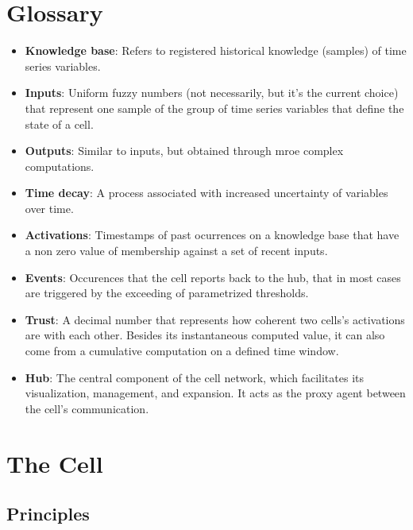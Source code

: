 \section{Glossary} \label{sec:glossary}


\begin{itemize}
    \item \textbf{Knowledge base}: Refers to registered historical knowledge (samples) of time series variables.

    \item \textbf{Inputs}: Uniform fuzzy numbers (not necessarily, but it's the current choice) that represent one sample of the group of time series variables that define the state of a cell.

    \item \textbf{Outputs}: Similar to inputs, but obtained through mroe complex computations.

    \item \textbf{Time decay}: A process associated with increased uncertainty of variables over time.

    \item \textbf{Activations}: Timestamps of past ocurrences on a knowledge base that have a non zero value of membership against a set of recent inputs.

    \item \textbf{Events}: Occurences that the cell reports back to the hub, that in most cases are triggered by the exceeding of parametrized thresholds.

    \item \textbf{Trust}: A decimal number that represents how coherent two cells's activations are with each other. Besides its instantaneous computed value, it can also come from a cumulative computation on a defined time window.

    \item \textbf{Hub}: The central component of the cell network, which facilitates its visualization, management, and expansion. It acts as the proxy agent between the cell's communication.

\end{itemize}

\section{The Cell} \label{sec:thecell}

\subsection{Principles}

